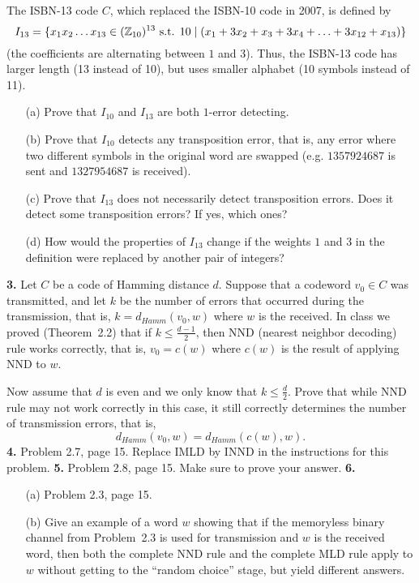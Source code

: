 \documentclass[12pt]{amsart}
\begin{document}
The ISBN-13 code $C$, which replaced the ISBN-10 code in 2007, is defined by
$$I_{13}=\{x_1x_2\ldots x_{13}\in ({\mathbb Z}_{10})^{13}\mbox{ s.t. } 10\mid (x_1+3x_2+x_3+3x_4+\ldots+3x_{12}+x_{13})\}$$
(the coefficients are alternating between $1$ and $3$). Thus, the ISBN-13 code has larger length (13 instead of 10), but uses smaller alphabet (10 symbols instead of 11).
\begin{itemize}
\item[(a)] Prove that $I_{10}$ and $I_{13}$ are both $1$-error detecting.
\item[(b)] Prove that $I_{10}$ detects any transposition error, that is, any error where two different symbols in the original word are swapped (e.g.
$1357924687$ is sent and $1327954687$ is received).
\item[(c)] Prove that $I_{13}$ does not necessarily detect transposition errors. Does it detect some transposition errors? If yes, which ones?
\item[(d)] How would the properties of $I_{13}$ change if the weights $1$ and $3$ in the definition were replaced by another pair of integers?
 \end{itemize}
\skv

{\bf 3.} Let $C$ be a code of Hamming distance $d$. Suppose that a codeword $v_0\in C$ was transmitted, and let $k$ be the number of errors that occurred during the transmission, that is, $k=d_{Hamm}(v_0,w)$ where $w$ is the received. In class we proved (Theorem~2.2) that if $k\leq \frac{d-1}{2}$, then NND (nearest neighbor decoding) rule works correctly, that is, $v_0=c(w)$ where $c(w)$ is the result of applying NND to $w$.

Now assume that $d$ is even and we only know that $k\leq \frac{d}{2}$. Prove that while NND rule may not work correctly in this case, it still correctly determines the number of transmission errors, that is, $$d_{Hamm}(v_0,w)=d_{Hamm}(c(w),w).$$  
\skv
{\bf 4.} Problem 2.7, page 15. Replace IMLD by INND in the instructions for this problem.
\skv
{\bf 5.} Problem 2.8, page 15. Make sure to prove your answer.
\skv
{\bf 6.}
\begin{itemize} 
\item[(a)] Problem 2.3, page 15.
\item[(b)] Give an example of a word $w$ showing that if the memoryless binary channel from Problem~2.3 is used for transmission and $w$ is the received word, 
then both the complete NND rule and the complete MLD rule apply to $w$ without getting to the ``random choice'' stage, but yield different answers. 
\end{itemize}
\end{document}
